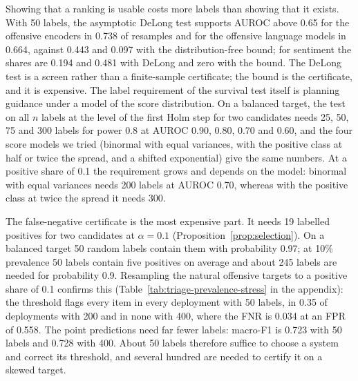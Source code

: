 Showing that a ranking is usable costs more labels than showing that it exists. With 50 labels, the asymptotic DeLong
test supports AUROC above 0.65 for the offensive encoders in 0.738 of resamples and for the offensive language models in 0.664,
against 0.443 and 0.097 with the distribution-free bound; for sentiment the shares are 0.194 and 0.481 with DeLong and
zero with the bound. The DeLong test is a screen rather than a finite-sample certificate; the bound is the
certificate, and it is expensive. The label requirement of the survival test itself is planning guidance under a model of the
score distribution. On a balanced target, the test on all $n$ labels at the level of the first Holm step for two
candidates needs 25, 50, 75 and 300 labels for power 0.8 at AUROC 0.90, 0.80, 0.70 and 0.60, and the four score models we tried (binormal with
equal variances, with the positive class at half or twice the spread, and a shifted exponential) give the same
numbers. At a positive share of 0.1 the requirement grows and depends on the model: binormal with equal variances needs
200 labels at AUROC 0.70, whereas with the positive class at twice the spread it needs 300.

The false-negative certificate is the most expensive part. It needs 19 labelled positives for two candidates at
$\alpha = 0.1$ (Proposition~\ref{prop:selection}). On a balanced target 50 random labels contain them with probability
0.97; at 10\% prevalence 50 labels contain five positives on average and about 245 labels are needed for probability
0.9. Resampling the natural offensive targets to a positive share of 0.1 confirms this
(Table~\ref{tab:triage-prevalence-stress} in the appendix): the threshold flags every item in every deployment with 50
labels, in 0.35 of deployments with 200 and in none with 400, where the FNR is 0.034 at an FPR of 0.558. The point
predictions need far fewer labels: macro-F1 is 0.723 with 50 labels and 0.728 with 400. About 50 labels therefore
suffice to choose a system and correct its threshold, and several hundred are needed to certify it on a skewed target.
